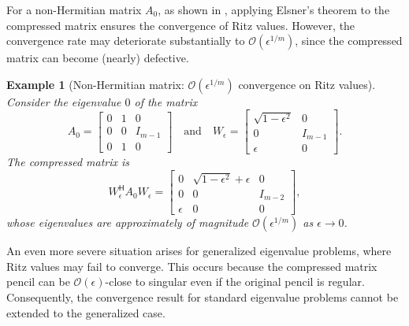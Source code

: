 \documentclass[a4paper,11pt]{article}
\newtheorem{example}{Example}
\newcommand{\Htran}{\mathsf{H}}
\newcommand{\order}{\mathcal{O}}
\begin{document}
For a non-Hermitian matrix $A_{0}$, as shown in \cite{Jia2001}, applying Elsner's theorem 
to the compressed matrix ensures the convergence of Ritz values.  However, the convergence rate may deteriorate substantially to $\order(\epsilon^{1/m})$, since the compressed matrix can become (nearly) defective.
\begin{example}[Non-Hermitian matrix: $\order(\epsilon^{1/m})$ convergence on Ritz values]
    \label{eg:nH}
    Consider the eigenvalue $0$ of the matrix 
\begin{equation*}
    A_{0} = \begin{bmatrix}
        0 & 1 & 0\\ 
        0 & 0 & I_{m-1}\\ 
        0 & 1 & 0
    \end{bmatrix}
    \quad\text{and}\quad 
    W_{\epsilon}=\begin{bmatrix}
        \sqrt{1-\epsilon^{2}} & 0\\ 
        0 & I_{m-1} \\ 
        \epsilon & 0
    \end{bmatrix}.
\end{equation*}
The compressed matrix is 
\begin{equation*}
    W_{\epsilon}^{\Htran}A_{0}W_{\epsilon}
     = 		\begin{bmatrix}
			0        & \sqrt{1-\epsilon^2} + \epsilon & 0       \\
			0        & 0                              & I_{m-2} \\
			\epsilon & 0                              & 0
		\end{bmatrix},
\end{equation*}
whose eigenvalues are approximately of magnitude $\order(\epsilon^{1/m})$ as $\epsilon\to 0$.
\end{example}


An even more severe situation arises for generalized eigenvalue problems, where Ritz values may fail to converge. This occurs because the compressed matrix pencil can be $\order(\epsilon)$-close to singular even if the original pencil is regular. Consequently, the convergence result for standard eigenvalue problems cannot be extended to the generalized case. 
\end{document}
